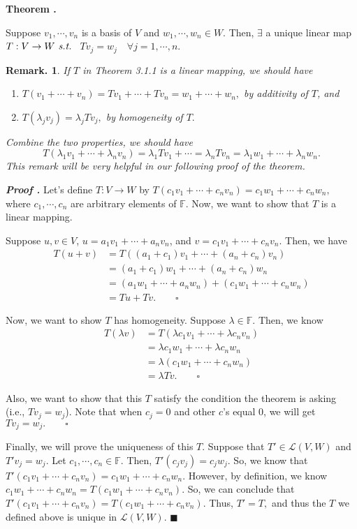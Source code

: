 \documentclass[11pt, letterpaper]{article}
\newcounter{index}[subsection]
\newenvironment*{thm}[1]{\begin{tcolorbox}\par\noindent\textbf{Theorem \thesubsection.\stepcounter{index}\theindex\ #1} \par}{\par\end{tcolorbox}}
\newcounter{nprf}[subsection]
\newenvironment*{prf}{\par\indent\textbf{\textit{Proof \stepcounter{nprf}\thenprf.}}}{\hfill$\blacksquare$\par}
\newtheorem*{rmk}{Remark.}
\def\F{\mathbb{F}}
\def\L{\mathcal{L}}
\def\st{\emph{ s.t. }}
\begin{document}
\begin{thm}{}
	Suppose $v_1,\cdots,v_n$ is a basis of $V$ and $w_1,\cdots,w_n\in W.$ Then, $\exists$ a unique linear map $T:V\to W\st$ $Tv_j=w_j\quad\forall j=1,\cdots,n.$
\end{thm}
\begin{rmk}
	If $T$ in Theorem 3.1.1 is a linear mapping, we should have 
	\begin{enumerate}
		\item $T(v_1+\cdots+v_n)=Tv_1+\cdots+Tv_n=w_1+\cdots+w_n,$ by additivity of $T$, and
		\item $T(\lambda_jv_j)=\lambda_jTv_j,$ by homogeneity of $T.$
	\end{enumerate}
	Combine the two properties, we should have \[T(\lambda_1v_1+\cdots+\lambda_nv_n)=\lambda_1Tv_1+\cdots=\lambda_nTv_n=\lambda_1w_1+\cdots+\lambda_nw_n.\]
	This remark will be very helpful in our following proof of the theorem.
\end{rmk}
\begin{prf}
	Let's define $T:V\to W$ by $T(c_1v_1+\cdots+c_nv_n)=c_1w_1+\cdots+c_nw_n,$ where $c_1,\cdots,c_n$ are arbitrary elements of $\F.$ Now, we want to show that $T$ is a linear mapping.\par 
	Suppose $u,v\in V$,  $u=a_1v_1+\cdots+a_nv_n$, and $v=c_1v_1+\cdots+c_nv_n.$ Then, we have \[\begin{aligned}T(u+v)&=T((a_1+c_1)v_1+\cdots+(a_n+c_n)v_n)\\&=(a_1+c_1)w_1+\cdots+(a_n+c_n)w_n\\&=(a_1w_1+\cdots+a_nw_n)+(c_1w_1+\cdots+c_nw_n)\\&=Tu+Tv.\qquad\square\end{aligned}\]\par 
	Now, we want to show $T$ has homogeneity. Suppose $\lambda\in\F.$ Then, we know \[\begin{aligned}T(\lambda v)&=T(\lambda c_1v_1+\cdots+\lambda c_nv_n)\\&=\lambda c_1w_1+\cdots+\lambda c_nw_n\\&=\lambda(c_1w_1+\cdots+c_nw_n)\\&=\lambda Tv.\qquad\square\end{aligned}\]\par 
	Also, we want to show that this $T$ satisfy the condition the theorem is asking (i.e., $Tv_j=w_j$). Note that when $c_j=0$ and other $c$'s equal $0$, we will get $Tv_j=w_j.\qquad\square$\par 
	Finally, we will prove the uniqueness of this $T$. Suppose that $T'\in\L(V,W)$ and $T'v_j=w_j.$ Let $c_1,\cdots,c_n\in\F.$ Then, $T'(c_jv_j)=c_jw_j.$ So, we know that $T'(c_1v_1+\cdots+c_nv_n)=c_1w_1+\cdots+c_nw_n.$ However, by definition, we know $c_1w_1+\cdots+c_nw_n=T(c_1w_1+\cdots+c_nv_n).$ So, we can conclude that $T'(c_1v_1+\cdots+c_nv_n)=T(c_1w_1+\cdots+c_nv_n).$ Thus, $T'=T,$ and thus the $T$ we defined above is unique in $\L(V,W).$
\end{prf}
\end{document}
